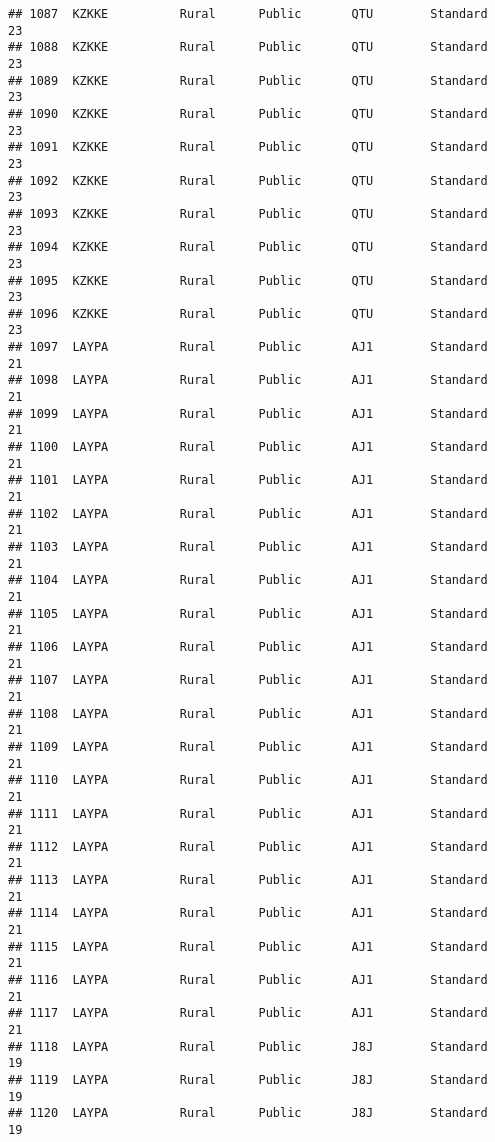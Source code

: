 \documentclass[
]{article}
\begin{document}
\begin{verbatim}
## 1087  KZKKE          Rural      Public       QTU        Standard        23
## 1088  KZKKE          Rural      Public       QTU        Standard        23
## 1089  KZKKE          Rural      Public       QTU        Standard        23
## 1090  KZKKE          Rural      Public       QTU        Standard        23
## 1091  KZKKE          Rural      Public       QTU        Standard        23
## 1092  KZKKE          Rural      Public       QTU        Standard        23
## 1093  KZKKE          Rural      Public       QTU        Standard        23
## 1094  KZKKE          Rural      Public       QTU        Standard        23
## 1095  KZKKE          Rural      Public       QTU        Standard        23
## 1096  KZKKE          Rural      Public       QTU        Standard        23
## 1097  LAYPA          Rural      Public       AJ1        Standard        21
## 1098  LAYPA          Rural      Public       AJ1        Standard        21
## 1099  LAYPA          Rural      Public       AJ1        Standard        21
## 1100  LAYPA          Rural      Public       AJ1        Standard        21
## 1101  LAYPA          Rural      Public       AJ1        Standard        21
## 1102  LAYPA          Rural      Public       AJ1        Standard        21
## 1103  LAYPA          Rural      Public       AJ1        Standard        21
## 1104  LAYPA          Rural      Public       AJ1        Standard        21
## 1105  LAYPA          Rural      Public       AJ1        Standard        21
## 1106  LAYPA          Rural      Public       AJ1        Standard        21
## 1107  LAYPA          Rural      Public       AJ1        Standard        21
## 1108  LAYPA          Rural      Public       AJ1        Standard        21
## 1109  LAYPA          Rural      Public       AJ1        Standard        21
## 1110  LAYPA          Rural      Public       AJ1        Standard        21
## 1111  LAYPA          Rural      Public       AJ1        Standard        21
## 1112  LAYPA          Rural      Public       AJ1        Standard        21
## 1113  LAYPA          Rural      Public       AJ1        Standard        21
## 1114  LAYPA          Rural      Public       AJ1        Standard        21
## 1115  LAYPA          Rural      Public       AJ1        Standard        21
## 1116  LAYPA          Rural      Public       AJ1        Standard        21
## 1117  LAYPA          Rural      Public       AJ1        Standard        21
## 1118  LAYPA          Rural      Public       J8J        Standard        19
## 1119  LAYPA          Rural      Public       J8J        Standard        19
## 1120  LAYPA          Rural      Public       J8J        Standard        19

\end{verbatim}
\end{document}
